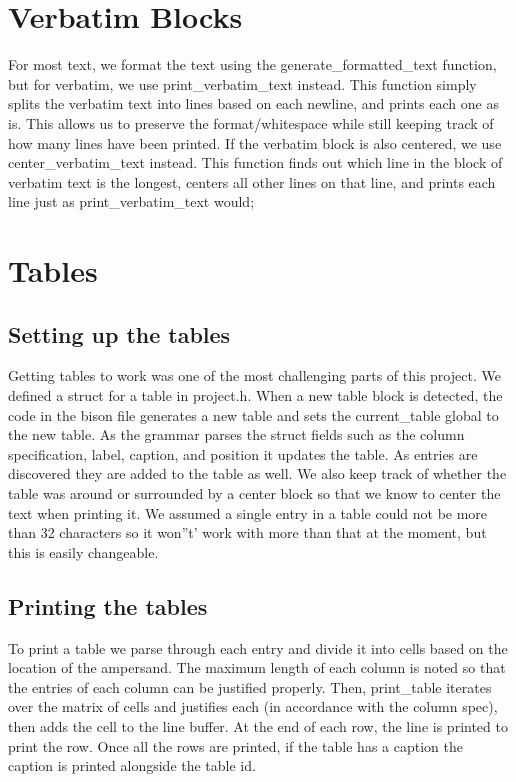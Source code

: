 \section{Verbatim Blocks}
For most text, we format the text using the generate_formatted_text function, but for verbatim, we use print_verbatim_text instead. This function simply splits the verbatim text into lines based on each newline, and prints each one as is. This allows us to preserve the format/whitespace while still keeping track of how many lines have been printed. If the verbatim block is also centered, we use center_verbatim_text instead. This function finds out which line in the block of verbatim text is the longest, centers all other lines on that line, and prints each line just as print_verbatim_text would;

\section{Tables}

\subsection{Setting up the tables}
Getting tables to work was one of the most challenging parts of this project. We defined a
struct for a table in project.h. When a new table block is detected, the code in the bison
file generates a new table and sets the current_table global to the new table. As the
grammar parses the struct fields such as the column specification, label, caption, and 
position it updates the table. As entries are discovered they are added to the table as
well. We also keep track of whether the table was around or surrounded by a center block 
so that we know to center the text when printing it. We assumed a single entry in a table 
could not be more than 32 characters so it won''t' work with more than that at the moment,
but this is easily changeable.

\subsection{Printing the tables}
To print a table we parse through each entry and divide it into cells based on the location
of the ampersand. The maximum length of each column is noted so that the entries of each 
column can be justified properly. Then, print_table iterates over the matrix of cells and
justifies each (in accordance with the column spec), then adds the cell to the line buffer.
At the end of each row, the line is printed to print the row. Once all the rows are 
printed, if the table has a caption the caption is printed alongside the table id.

